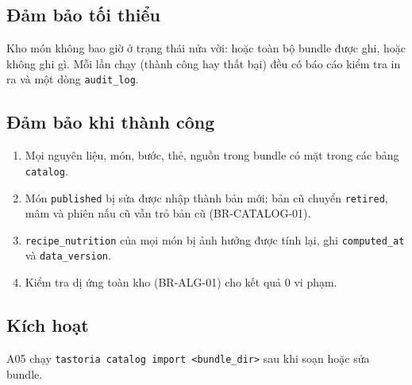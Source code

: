 \subsection{Đảm bảo tối thiểu}
Kho món không bao giờ ở trạng thái nửa vời: hoặc toàn bộ bundle được ghi, hoặc không ghi gì. Mỗi lần chạy (thành công hay thất bại) đều có báo cáo kiểm tra in ra và một dòng {\small\texttt{audit\_\allowbreak{}\allowbreak{}log}}.

\subsection{Đảm bảo khi thành công}
\begin{enumerate}
\item Mọi nguyên liệu, món, bước, thẻ, nguồn trong bundle có mặt trong các bảng {\small\texttt{catalog}}.
\item Món {\small\texttt{published}} bị sửa được nhập thành bản mới; bản cũ chuyển {\small\texttt{retired}}, mâm và phiên nấu cũ vẫn trỏ bản cũ (BR-\allowbreak{}CATALOG-\allowbreak{}01).
\item {\small\texttt{recipe\_\allowbreak{}\allowbreak{}nutrition}} của mọi món bị ảnh hưởng được tính lại, ghi {\small\texttt{computed\_\allowbreak{}\allowbreak{}at}} và {\small\texttt{data\_\allowbreak{}\allowbreak{}version}}.
\item Kiểm tra dị ứng toàn kho (BR-\allowbreak{}ALG-\allowbreak{}01) cho kết quả 0 vi phạm.
\end{enumerate}
\subsection{Kích hoạt}
A05 chạy {\small\texttt{tastoria catalog import <bundle\_\allowbreak{}\allowbreak{}dir>}} sau khi soạn hoặc sửa bundle.

